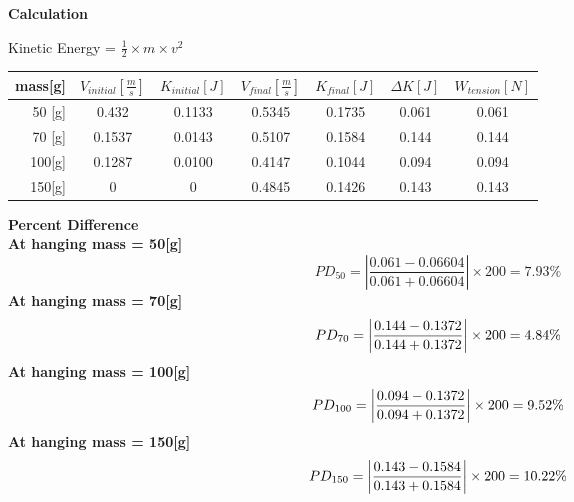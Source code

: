 \documentclass[12pt,letterpaper,fleqn]{article}
\begin{document}
\hfill
{}
\vspace{2ex}
\begin{center}
	{\LARGE\bf Calculation}
\end{center}

	Kinetic Energy = $\frac{1}{2}\times m\times v^2$\\


\begin{table}[htb]
\begin{center}
	  \begin{tabular}{|r||c|c|c|c|c|c|}\hline
    mass[g] & $V_{initial}[\frac{m}{s}]$ &$K_{initial}[J]$ & $V_{final}[\frac{m}{s}]$& $K_{final}[J]$&$\Delta K[J]$&$W_{tension}[N]$ \\\hline
    50 [g]   &0.432  & 0.1133 & 0.5345 & 0.1735 & 0.061 & 0.061\\\hline
    70 [g]   &0.1537 & 0.0143 & 0.5107 & 0.1584 & 0.144 & 0.144\\\hline
    100[g]  &0.1287 & 0.0100 & 0.4147 & 0.1044 & 0.094 & 0.094\\\hline
    150[g]  &0      & 0      & 0.4845 & 0.1426 & 0.143 &0.143\\\hline
  \end{tabular}

\end{center}\end{table}

\bf Percent Difference\\

At hanging mass = 50[g]\\
\[
PD_{50} = \left|\frac{0.061-0.06604}{0.061+0.06604}\right|\times200=7.93\%
\]
At hanging mass = 70[g]\\
\[
PD_{70} = \left|\frac{0.144-0.1372}{0.144+0.1372}\right|\times200=4.84\%\\
\]
At hanging mass = 100[g]\\
\[
PD_{100} = \left|\frac{0.094-0.1372}{0.094+0.1372}\right|\times200=9.52\%\\
\]
At hanging mass = 150[g]\\
\[
PD_{150} = \left|\frac{0.143-0.1584}{0.143+0.1584}\right|\times200=10.22\%\\
\]
\end{document}
